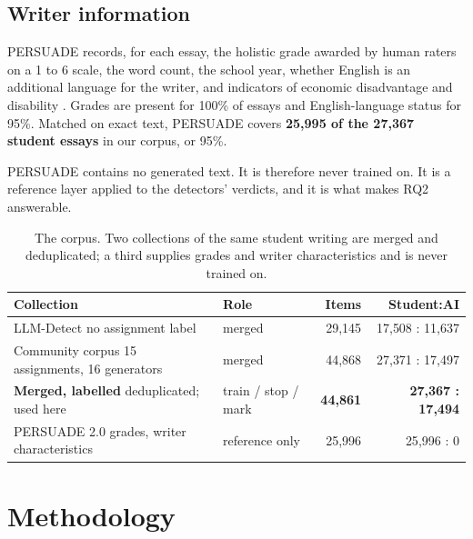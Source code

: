\documentclass[11pt,a4paper]{article}
\begin{document}
\subsection{Writer information}

PERSUADE records, for each essay, the holistic grade awarded by human
raters on a 1 to 6 scale, the word count, the school year, whether English
is an additional language for the writer, and indicators of economic
disadvantage and disability \cite{crossley2024}. Grades are present for
100\% of essays and English-language status for 95\%. Matched on exact
text, PERSUADE covers \textbf{25{,}995 of the 27{,}367 student essays} in
our corpus, or 95\%.

PERSUADE contains no generated text. It is therefore never trained on. It
is a reference layer applied to the detectors' verdicts, and it is what
makes RQ2 answerable.

\begin{table}[tb]
\centering
\small
\caption{The corpus. Two collections of the same student writing are merged
and deduplicated; a third supplies grades and writer characteristics and is
never trained on.}
\label{tab:data}
\begin{tabular}{@{}p{2.6cm}p{2.0cm}rr@{}}
\toprule
\textbf{Collection} & \textbf{Role} & \textbf{Items} & \textbf{Student:AI} \\
\midrule
LLM-Detect \cite{king2023} \newline
{\footnotesize no assignment label} &
merged & 29{,}145 & 17{,}508 : 11{,}637 \\
\addlinespace
Community corpus \cite{daigt2024} \newline
{\footnotesize 15 assignments, 16 generators} &
merged & 44{,}868 & 27{,}371 : 17{,}497 \\
\addlinespace
\textbf{Merged, labelled} \newline
{\footnotesize deduplicated; used here} &
train / stop / mark & \textbf{44{,}861} & \textbf{27{,}367 : 17{,}494} \\
\addlinespace
PERSUADE 2.0 \cite{crossley2024} \newline
{\footnotesize grades, writer characteristics} &
reference only & 25{,}996 & 25{,}996 : 0 \\
\bottomrule
\end{tabular}
\end{table}

\section{Methodology}
\end{document}
